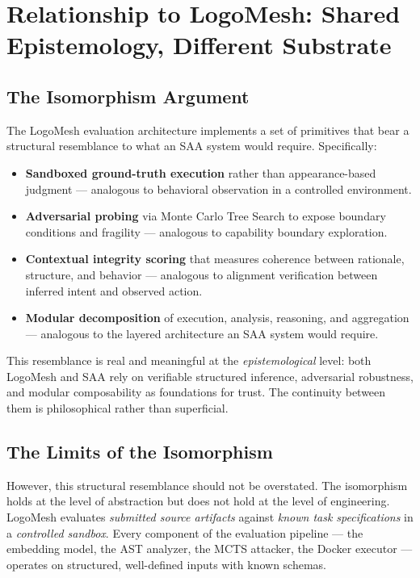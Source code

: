 \documentclass[11pt, a4paper]{article}
\begin{document}
\section{Relationship to LogoMesh: Shared Epistemology, Different Substrate}

\subsection{The Isomorphism Argument}

The LogoMesh evaluation architecture implements a set of primitives that bear a structural resemblance to what an SAA system would require. Specifically:

\begin{itemize}[leftmargin=*]
  \item \textbf{Sandboxed ground-truth execution} rather than appearance-based judgment — analogous to behavioral observation in a controlled environment.
  \item \textbf{Adversarial probing} via Monte Carlo Tree Search to expose boundary conditions and fragility — analogous to capability boundary exploration.
  \item \textbf{Contextual integrity scoring} that measures coherence between rationale, structure, and behavior — analogous to alignment verification between inferred intent and observed action.
  \item \textbf{Modular decomposition} of execution, analysis, reasoning, and aggregation — analogous to the layered architecture an SAA system would require.
\end{itemize}

This resemblance is real and meaningful at the \emph{epistemological} level: both LogoMesh and SAA rely on verifiable structured inference, adversarial robustness, and modular composability as foundations for trust. The continuity between them is philosophical rather than superficial.

\subsection{The Limits of the Isomorphism}

However, this structural resemblance should not be overstated. The isomorphism holds at the level of abstraction but does not hold at the level of engineering. LogoMesh evaluates \emph{submitted source artifacts} against \emph{known task specifications} in a \emph{controlled sandbox}. Every component of the evaluation pipeline — the embedding model, the AST analyzer, the MCTS attacker, the Docker executor — operates on structured, well-defined inputs with known schemas.
\end{document}
